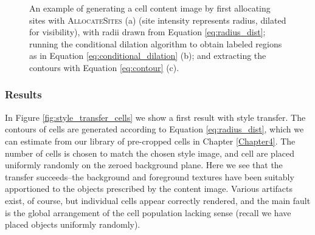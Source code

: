 \begin{figure}%
    \centering
    \qquad
    \qquad
    \caption{An example of generating a cell content image by first allocating sites with \textsc{AllocateSites} (a) (site intensity represents radius, dilated for visibility), with radii drawn from Equation \ref{eq:radius_dist}; running the conditional dilation algorithm to obtain labeled regions as in Equation \ref{eq:conditional_dilation} (b); and extracting the contours with Equation \ref{eq:contour} (c).}%
    \label{fig:conditional_dilation_process}
\end{figure}

\subsubsection{Results}

In Figure \ref{fig:style_transfer_cells} we show a first result with style transfer. The contours of cells are generated according to Equation \ref{eq:radius_dist}, which we can estimate from our library of pre-cropped cells in Chapter \ref{Chapter4}. The number of cells is chosen to match the chosen style image, and cell are placed uniformly randomly on the zeroed background plane. Here we see that the transfer succeeds--the background and foreground textures have been suitably apportioned to the objects prescribed by the content image. Various artifacts exist, of course, but individual cells appear correctly rendered, and the main fault is the global arrangement of the cell population lacking sense (recall we have placed objects uniformly randomly).

